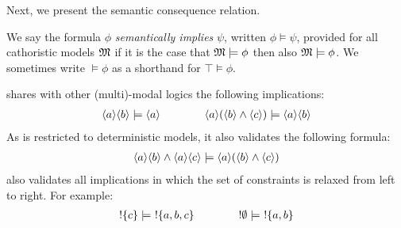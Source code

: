
\NI Next, we present the semantic consequence relation.
\begin{definition} 
 We say the formula $\phi$ \emph{semantically implies} $\psi$, written $\phi
   \models \psi$, provided for all cathoristic models $\frak{M}$ if it is the
   case that $\frak{M} \models \phi$ then also $\frak{M} \models \phi$.
   We sometimes write $\models \phi$ as a shorthand for $\top \models \phi$.
\end{definition}

\NI \Cathoristic{} shares with other (multi)-modal logics the following
implications:
\begin{eqnarray*}
\langle a \rangle \langle b \rangle \models \langle a \rangle \qquad\qquad
\langle a \rangle (\langle b \rangle \land \langle c \rangle ) \models \langle a \rangle \langle b \rangle \end{eqnarray*}
As \cathoristic{} is restricted to deterministic models, it also
validates the following formula:
\begin{eqnarray*}
\langle a \rangle \langle b \rangle \land \langle a \rangle \langle c \rangle \models \langle a \rangle (\langle b \rangle \land \langle c \rangle )
\end{eqnarray*}
\Cathoristic{} also validates all implications in which the set of constraints is relaxed from left to right. For example:
\begin{eqnarray*}
! \{c\} \models\ ! \{a, b, c\} 
 \qquad\qquad
! \emptyset \models\ ! \{a, b\} 
\end{eqnarray*}

